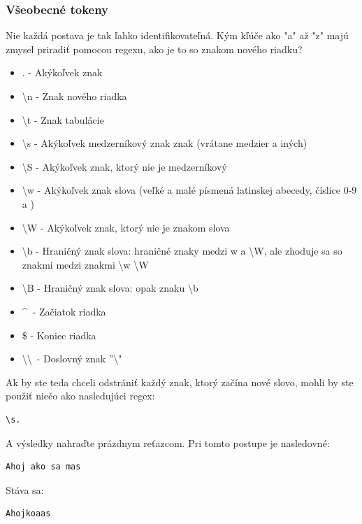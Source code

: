 \documentclass[10pt,twoside,slovak,a4paper]{article}
\begin{document}
\subsubsection{Všeobecné tokeny}
Nie každá postava je tak ľahko identifikovateľná. Kým kľúče ako "a" až "z" majú zmysel priradiť pomocou regexu, ako je to so znakom nového riadku?
\begin{itemize}
	\item . - Akýkoľvek znak
	\item \textbackslash n - Znak nového riadka
	\item \textbackslash t - Znak tabulácie
	\item \textbackslash s - Akýkoľvek medzerníkový znak znak (vrátane medzier a iných)
	\item \textbackslash S - Akýkoľvek znak, ktorý nie je medzerníkový
	\item \textbackslash w - Akýkoľvek znak slova (veľké a malé písmená latinskej abecedy, číslice 0-9 a \textunderscore )
	\item \textbackslash W - Akýkoľvek znak, ktorý nie je znakom slova
	\item \textbackslash b - Hraničný znak slova: hraničné znaky medzi w a \textbackslash W, ale zhoduje sa so znakmi medzi znakmi \textbackslash w \textbackslash W
	\item \textbackslash B - Hraničný znak slova: opak znaku \textbackslash b
	\item \textasciicircum \ - Začiatok riadka
	\item \$ - Koniec riadka
	\item \textbackslash \textbackslash \ - Doslovný znak ''\textbackslash"
 	\end{itemize}
	 Ak by ste teda chceli odstrániť každý znak, ktorý začína nové slovo, mohli by ste použiť niečo ako nasledujúci regex:\\
\begin{lstlisting}[frame=single, basicstyle=\ttfamily\small, label=code:example]
	\s.
	\end{lstlisting}
	A výsledky nahraďte prázdnym reťazcom. Pri tomto postupe je nasledovné:
\begin{lstlisting}[frame=single, basicstyle=\ttfamily\small, label=code:example]
	Ahoj ako sa mas
	\end{lstlisting}
	Stáva sa:
\begin{lstlisting}[frame=single, basicstyle=\ttfamily\small, label=code:example]
	Ahojkoaas
	\end{lstlisting}
\end{document}
